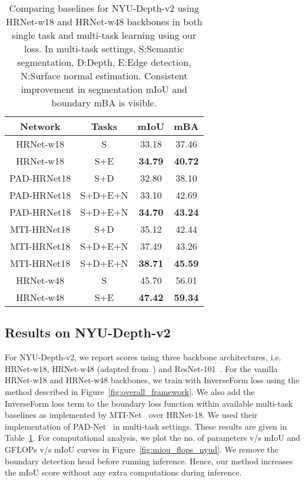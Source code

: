 \documentclass[final]{cvpr}
\def\inv#1{{\color{blue}{\bf {w/ ours}}}}
\begin{document}
\begin{table}[t] 
\centering
 \begin{tabular}{c|c|cc} 
 \hline
 Network & Tasks &  mIoU & mBA \\ 
 \hline
 \hline
  HRNet-w18 & S & 33.18 & 37.46 \\ 
  HRNet-w18 \inv{} & S+E & \textbf{34.79} & \textbf{40.72} \\ 
 \hline
  PAD-HRNet18 & S+D & 32.80 & 38.10 \\   
  PAD-HRNet18 & S+D+E+N & 33.10 & 42.69 \\   
  PAD-HRNet18 \inv{} & S+D+E+N & \textbf{34.70} & \textbf{43.24} \\   
 \hline
  MTI-HRNet18 & S+D & 35.12 & 42.44 \\
  MTI-HRNet18 & S+D+E+N & 37.49 & 43.26 \\
  MTI-HRNet18 \inv{} & S+D+E+N & \textbf{38.71} & \textbf{45.59} \\
 \hline
  HRNet-w48 & S & 45.70 & 56.01 \\ 
  HRNet-w48 \inv{} & S+E & \textbf{47.42} & \textbf{59.34} \\
 \hline
\end{tabular}
\caption{Comparing baselines for NYU-Depth-v2 using HRNet-w18 and HRNet-w48 backbones in both single task and multi-task learning using our loss. In multi-task settings, S:Semantic segmentation, D:Depth, E:Edge detection, N:Surface normal estimation. Consistent improvement in segmentation mIoU and boundary mBA is visible.}\label{tab:nyud}
\end{table}

\subsection{Results on NYU-Depth-v2}
For NYU-Depth-v2, we report scores using three backbone architectures, i.e. HRNet-w18, HRNet-w48 (adapted from~\cite{hrnet}) and ResNet-101~\cite{resnet}. For the vanilla HRNet-w18 and HRNet-w48 backbones, we train with InverseForm loss using the method described in Figure~\ref{fig:overall_framework}. We also add the InverseForm loss term to the boundary loss function within available multi-task baselines as implemented by MTI-Net~\cite{vandenhende2020mti} over HRNet-18. We used their implementation of PAD-Net~\cite{xu2018pad} in multi-task settings. These results are given in Table~\ref{tab:nyud}. For computational analysis, we plot the no. of parameters v/s mIoU and GFLOPs v/s mIoU curves in Figure~\ref{fig:miou_flops_nyud}. We remove the boundary detection head before running inference. Hence, our method increases the mIoU score without any extra computations during inference.  
\end{document}
